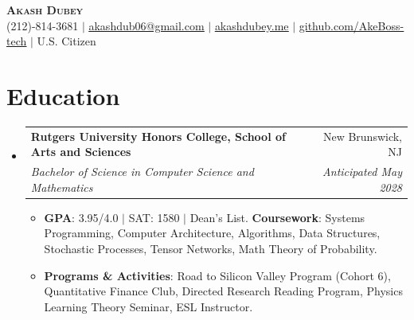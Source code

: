 \documentclass[letterpaper,11pt]{article}
\makeatletter
\newcommand{\resumeItem}[1]{
  \item\small{
    {#1 \vspace{-2pt}}
  }
}
\newcommand{\resumeSubheading}[4]{
  \vspace{-2pt}\item
    \begin{tabular*}{0.97\textwidth}[t]{l@{\extracolsep{\fill}}r}
      \textbf{#1} & #2 \\
      \textit{\small#3} & \textit{\small #4} \\
    \end{tabular*}\vspace{-7pt}
}
\newcommand{\resumeSubHeadingListStart}{\begin{itemize}[leftmargin=0.15in, label={}]}
\newcommand{\resumeSubHeadingListEnd}{\end{itemize}}
\newcommand{\resumeItemListStart}{\begin{itemize}}
\newcommand{\resumeItemListEnd}{\end{itemize}\vspace{-5pt}}
\makeatother
\begin{document}
\begin{center}
    \textbf{\Huge \scshape Akash Dubey} \\ \vspace{1pt}
    \small (212)-814-3681 $|$ \href{mailto:akashdub06@gmail.com}{\underline{akashdub06@gmail.com}} $|$
    \href{https://akashdubey.me/}{\underline{akashdubey.me}} $|$
    \href{https://github.com/AkeBoss-tech}{\underline{github.com/AkeBoss-tech}} $|$
    \small U.S. Citizen
\end{center}
\section{Education}
  \resumeSubHeadingListStart
    \resumeSubheading
      {Rutgers University Honors College, School of Arts and Sciences}{New Brunswick, NJ}
      {Bachelor of Science in Computer Science and Mathematics}{Anticipated May 2028}
      \resumeItemListStart
        \resumeItem{\textbf{GPA}: 3.95/4.0 $|$ SAT: 1580 $|$ Dean's List. \textbf{Coursework}: Systems Programming, Computer Architecture, Algorithms, Data Structures, Stochastic Processes, Tensor Networks, Math Theory of Probability.}
        \resumeItem{\textbf{Programs \& Activities}: Road to Silicon Valley Program (Cohort 6), Quantitative Finance Club, Directed Research Reading Program, Physics Learning Theory Seminar, ESL Instructor.}
      \resumeItemListEnd
  \resumeSubHeadingListEnd
\end{document}
